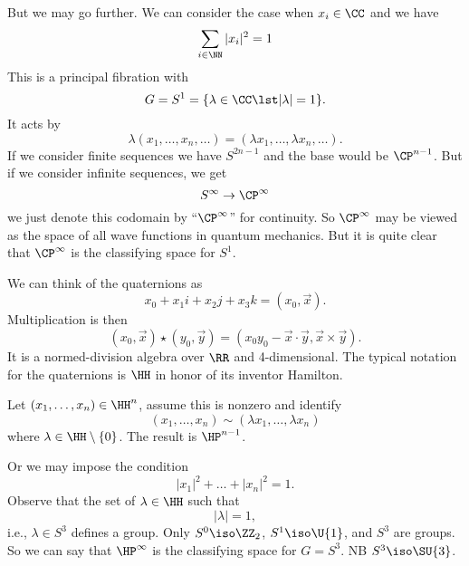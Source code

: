 \begin{ex}
But we may go further. We can consider the case when
$x_{i}\in\CC$ and we have
\begin{equation}
\sum_{i\in\NN}|x_{i}|^{2}=1
\end{equation}
This is a principal fibration with
\begin{equation}
G=S^{1}=\{\lambda\in\CC\lst|\lambda|=1\}.
\end{equation}
It acts by
\begin{equation}
\lambda(x_{1},\dots,x_{n},\dots)=(\lambda x_{1},\dots,\lambda
x_{n},\dots).
\end{equation}
If we consider finite sequences we have $S^{2n-1}$ and the base
would be $\CP^{n-1}$. But if we consider infinite sequences, we
get
\begin{equation}
S^{\infty}\to\CP^{\infty}
\end{equation}
we just denote this codomain by ``$\CP^{\infty}$'' for
continuity. So $\CP^{\infty}$\index{$\CP^{\infty}$} may be viewed as the space of all
wave functions in quantum mechanics. But it is quite clear that
$\CP^{\infty}$ is the classifying space for $S^{1}$.
\end{ex}

We can think of the quaternions as
\begin{equation}
x_{0}+x_{1}i+x_{2}j+x_{3}k=(x_{0},\vec{x}).
\end{equation}
Multiplication is then 
\begin{equation}
(x_{0},\vec{x})\star(y_{0},\vec{y})=(x_{0}y_{0}-\vec{x}\cdot\vec{y},\vec{x}\times\vec{y}).
\end{equation}
It is a normed-division algebra over $\RR$ and 4-dimensional. The
typical notation for the quaternions is $\HH$ in honor of its
inventor Hamilton.

Let $(x_{1},\dots,x_{n})\in\HH^{n}$, assume this is nonzero and
identify
\begin{equation}
(x_{1},\dots,x_{n})\sim(\lambda x_{1},\dots, \lambda x_{n})
\end{equation}
where $\lambda\in\HH\setminus\{0\}$. The result is
$\HP^{n-1}$. 

Or we may impose the condition
\begin{equation}
|x_{1}|^{2}+\dots+|x_{n}|^{2}=1.
\end{equation}
Observe that the set of $\lambda\in\HH$ such that
\begin{equation}
|\lambda|=1,
\end{equation}
i.e., $\lambda\in S^{3}$ defines a group. Only $S^{0}\iso\ZZ_{2}$,
$S^{1}\iso\U{1}$, and $S^{3}$ are groups. So we can say that
$\HP^{\infty}$\index{$\HP^{\infty}$} is the classifying
space for $G=S^{3}$. NB
$S^{3}\iso\SU{3}$. 

